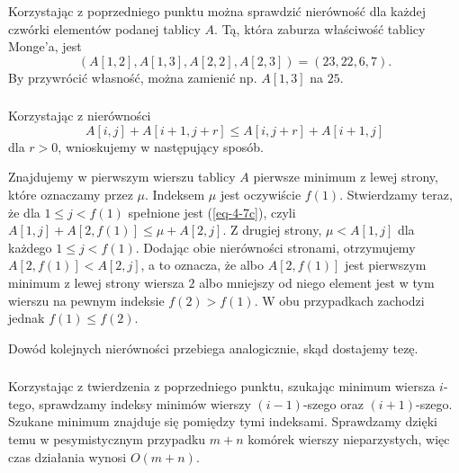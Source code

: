 
\subsubsection{} %
Korzystając z poprzedniego punktu można sprawdzić nierówność dla każdej czwórki elementów podanej tablicy $A$. Tą, która zaburza właściwość tablicy Monge'a, jest
\[
	(A[1,2],A[1,3],A[2,2],A[2,3]) = (23,22,6,7).
\]
By przywrócić własność, można zamienić np. $A[1,3]$ na $25$.

\subsubsection{} %
Korzystając z nierówności
\begin{equation}
	A[i,j]+A[i+1,j+r]\le A[i,j+r]+A[i+1,j] \label{eq-4-7c}
\end{equation}
dla $r>0$, wnioskujemy w następujący sposób.

Znajdujemy w pierwszym wierszu tablicy $A$ pierwsze minimum z lewej strony, które oznaczamy przez $\mu$. Indeksem $\mu$ jest oczywiście $f(1)$. Stwierdzamy teraz, że dla $1\le j<f(1)$ spełnione jest (\ref{eq-4-7c}), czyli $A[1,j]+A[2,f(1)]\le\mu+A[2,j]$. Z drugiej strony, $\mu<A[1,j]$ dla każdego $1\le j<f(1)$. Dodając obie nierówności stronami, otrzymujemy $A[2,f(1)]<A[2,j]$, a to oznacza, że albo $A[2,f(1)]$ jest pierwszym minimum z lewej strony wiersza $2$ albo mniejszy od niego element jest w tym wierszu na pewnym indeksie $f(2)>f(1)$. W obu przypadkach zachodzi jednak $f(1)\le f(2)$.

Dowód kolejnych nierówności przebiega analogicznie, skąd dostajemy tezę.

\subsubsection{} %
Korzystając z twierdzenia z poprzedniego punktu, szukając minimum wiersza $i$-tego, sprawdzamy indeksy minimów wierszy $(i-1)$-szego oraz $(i+1)$-szego. Szukane minimum znajduje się pomiędzy tymi indeksami. Sprawdzamy dzięki temu w pesymistycznym przypadku $m+n$ komórek wierszy nieparzystych, więc czas działania wynosi $O(m+n)$.

\subsubsection{} %
